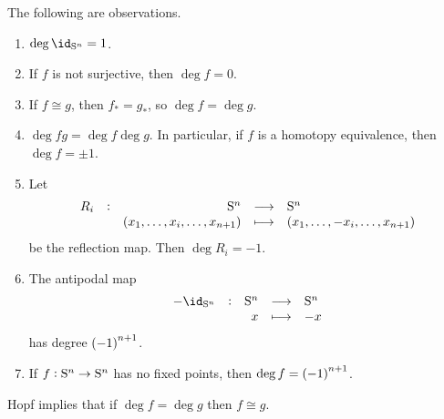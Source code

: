 \begin{proposition}
The following are observations.
\begin{enumerate}
\item $ \deg \id_{\S^n} = 1 $.
\item If $ f $ is not surjective, then $ \deg f = 0 $.
\item If $ f \cong g $, then $ f_* = g_* $, so $ \deg f = \deg g $.
\item $ \deg fg = \deg f\deg g $. In particular, if $ f $ is a homotopy equivalence, then $ \deg f = \pm 1 $.
\item Let
$$ \function[R_i]{\S^n}{\S^n}{\br{x_1, \dots, x_i, \dots, x_{n + 1}}}{\br{x_1, \dots, -x_i, \dots, x_{n + 1}}} $$
be the reflection map. Then $ \deg R_i = -1 $.
\item The antipodal map
$$ \function[-\id_{\S^n}]{\S^n}{\S^n}{x}{-x} $$
has degree $ \br{-1}^{n + 1} $.
\item If $ f : \S^n \to \S^n $ has no fixed points, then $ \deg f = \br{-1}^{n + 1} $.
\end{enumerate}
\end{proposition}

Hopf implies that if $ \deg f = \deg g $ then $ f \cong g $.

